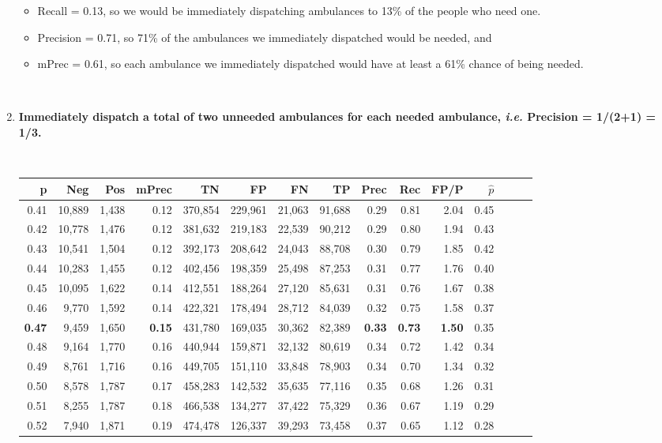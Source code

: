 \begin{enumerate}
\begin{itemize}
	\item Recall = 0.13, so we would be immediately dispatching ambulances to 13\% of the people who need one.  
	\item Precision = 0.71, so 71\% of the ambulances we immediately dispatched would be needed, and 
	\item mPrec = 0.61, so each ambulance we immediately dispatched would have at least a 61\% chance of being needed.  
\end{itemize}

	  
	\
	
	\item {\bf Immediately dispatch a total of two unneeded ambulances for each needed ambulance, {\it i.e.} Precision = 1/(2+1) = 1/3.}
	
	\
	
\begin{tabular}{rrrrrrrrrrrrrrr}
\toprule
p &     Neg &    Pos & mPrec &       TN &       FP &       FN &       TP &  Prec &   Rec &  FP/P & $\hat{p}$ \\
\midrule
0.41 &  10,889 &  1,438 &  0.12 &  370,854 &  229,961 &   21,063 &   91,688 &  0.29 &  0.81 &  2.04 &      0.45 \\
0.42 &  10,778 &  1,476 &  0.12 &  381,632 &  219,183 &   22,539 &   90,212 &  0.29 &  0.80 &  1.94 &      0.43 \\
0.43 &  10,541 &  1,504 &  0.12 &  392,173 &  208,642 &   24,043 &   88,708 &  0.30 &  0.79 &  1.85 &      0.42 \\
0.44 &  10,283 &  1,455 &  0.12 &  402,456 &  198,359 &   25,498 &   87,253 &  0.31 &  0.77 &  1.76 &      0.40 \\
0.45 &  10,095 &  1,622 &  0.14 &  412,551 &  188,264 &   27,120 &   85,631 &  0.31 &  0.76 &  1.67 &      0.38 \\
0.46 &   9,770 &  1,592 &  0.14 &  422,321 &  178,494 &   28,712 &   84,039 &  0.32 &  0.75 &  1.58 &      0.37 \\
\bf 0.47 &   9,459 &  1,650 & \bf  0.15 &  431,780 &  169,035 &   30,362 &   82,389 & \bf 0.33 & \bf 0.73 & \bf 1.50 &      0.35 \\
0.48 &   9,164 &  1,770 &  0.16 &  440,944 &  159,871 &   32,132 &   80,619 &  0.34 &  0.72 &  1.42 &      0.34 \\
0.49 &   8,761 &  1,716 &  0.16 &  449,705 &  151,110 &   33,848 &   78,903 &  0.34 &  0.70 &  1.34 &      0.32 \\
0.50 &   8,578 &  1,787 &  0.17 &  458,283 &  142,532 &   35,635 &   77,116 &  0.35 &  0.68 &  1.26 &      0.31 \\
0.51 &   8,255 &  1,787 &  0.18 &  466,538 &  134,277 &   37,422 &   75,329 &  0.36 &  0.67 &  1.19 &      0.29 \\
0.52 &   7,940 &  1,871 &  0.19 &  474,478 &  126,337 &   39,293 &   73,458 &  0.37 &  0.65 &  1.12 &      0.28 \\
\bottomrule
\end{tabular}


\end{enumerate}
